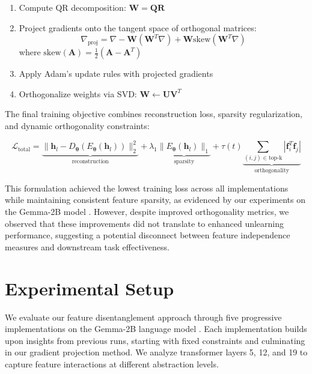 \documentclass{article} %
\begin{document}
\begin{enumerate}
    \item Compute QR decomposition: $\mathbf{W} = \mathbf{Q}\mathbf{R}$
    \item Project gradients onto the tangent space of orthogonal matrices:
    \begin{equation}
        \nabla_{\text{proj}} = \nabla - \mathbf{W}(\mathbf{W}^T\nabla) + \mathbf{W}\text{skew}(\mathbf{W}^T\nabla)
    \end{equation}
    where $\text{skew}(\mathbf{A}) = \frac{1}{2}(\mathbf{A} - \mathbf{A}^T)$
    \item Apply Adam's update rules with projected gradients
    \item Orthogonalize weights via SVD: $\mathbf{W} \leftarrow \mathbf{U}\mathbf{V}^T$
\end{enumerate}

The final training objective combines reconstruction loss, sparsity regularization, and dynamic orthogonality constraints:

\begin{equation}
    \mathcal{L}_{\text{total}} = \underbrace{\|\mathbf{h}_l - D_{\boldsymbol{\theta}}(E_{\boldsymbol{\theta}}(\mathbf{h}_l))\|_2^2}_{\text{reconstruction}} + \lambda_1 \underbrace{\|E_{\boldsymbol{\theta}}(\mathbf{h}_l)\|_1}_{\text{sparsity}} + \tau(t) \underbrace{\sum_{(i,j) \in \text{top-k}} |\mathbf{f}_i^T \mathbf{f}_j|}_{\text{orthogonality}}
\end{equation}

This formulation achieved the lowest training loss across all implementations while maintaining consistent feature sparsity, as evidenced by our experiments on the Gemma-2B model \cite{gpt4}. However, despite improved orthogonality metrics, we observed that these improvements did not translate to enhanced unlearning performance, suggesting a potential disconnect between feature independence measures and downstream task effectiveness.

\section{Experimental Setup}
\label{sec:experimental}

We evaluate our feature disentanglement approach through five progressive implementations on the Gemma-2B language model \cite{gpt4}. Each implementation builds upon insights from previous runs, starting with fixed constraints and culminating in our gradient projection method. We analyze transformer layers 5, 12, and 19 to capture feature interactions at different abstraction levels.
\end{document}
